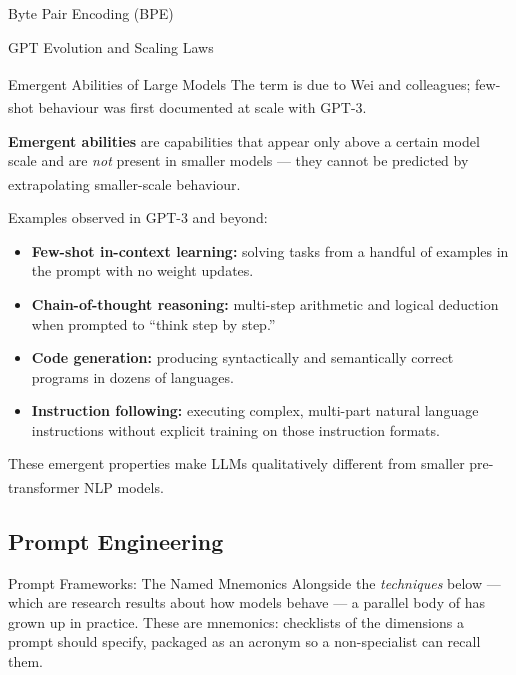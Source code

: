 \begin{v3topic}{Byte Pair Encoding (BPE)}
\begin{v3topic}{GPT Evolution and Scaling Laws}
\end{v3topic}
\begin{v3topic}{Emergent Abilities of Large Models}
    The term is due to Wei and
    colleagues\textsuperscript{\cite{weiEmergentAbilitiesLarge2022}}; few-shot
    behaviour was first documented at scale with
    GPT-3\textsuperscript{\cite{brownLanguageModelsAre2020}}.

    \textbf{Emergent abilities} are capabilities that appear only above a certain model
    scale and are \emph{not} present in smaller models --- they cannot be predicted by
    extrapolating smaller-scale
    behaviour.\textsuperscript{\cite[][p.~107]{farrisHowLargeLanguage2025}}

    Examples observed in GPT-3 and beyond:
    \begin{itemize}
        \item \textbf{Few-shot in-context learning:} solving tasks from a handful of
              examples in the prompt with no weight updates.
        \item \textbf{Chain-of-thought reasoning:} multi-step arithmetic and logical
              deduction when prompted to ``think step by step.''
        \item \textbf{Code generation:} producing syntactically and semantically correct
              programs in dozens of languages.
        \item \textbf{Instruction following:} executing complex, multi-part natural
              language instructions without explicit training on those instruction formats.
    \end{itemize}
    These emergent properties make LLMs qualitatively different from smaller
    pre-transformer NLP
    models.\textsuperscript{\cite[][p.~114]{farrisHowLargeLanguage2025}}

\end{v3topic}

\subsection{Prompt Engineering}


\begin{v3topic}{Prompt Frameworks: The Named Mnemonics}
    Alongside the \emph{techniques} below --- which are research results about
    how models behave --- a parallel body of  has
    grown up in practice. These are mnemonics: checklists of the dimensions a
    prompt should specify, packaged as an acronym so a non-specialist can
    recall them.


\end{v3topic}
\end{v3topic}

